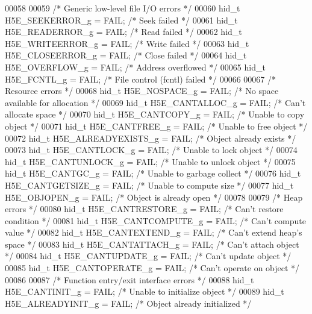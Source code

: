 \begin{DoxyCode}
00058 
00059 \textcolor{comment}{/* Generic low-level file I/O errors */}
00060 hid\_t H5E\_SEEKERROR\_g      = FAIL;      \textcolor{comment}{/* Seek failed */}
00061 hid\_t H5E\_READERROR\_g      = FAIL;      \textcolor{comment}{/* Read failed */}
00062 hid\_t H5E\_WRITEERROR\_g     = FAIL;      \textcolor{comment}{/* Write failed */}
00063 hid\_t H5E\_CLOSEERROR\_g     = FAIL;      \textcolor{comment}{/* Close failed */}
00064 hid\_t H5E\_OVERFLOW\_g       = FAIL;      \textcolor{comment}{/* Address overflowed */}
00065 hid\_t H5E\_FCNTL\_g          = FAIL;      \textcolor{comment}{/* File control (fcntl) failed */}
00066 
00067 \textcolor{comment}{/* Resource errors */}
00068 hid\_t H5E\_NOSPACE\_g        = FAIL;      \textcolor{comment}{/* No space available for allocation */}
00069 hid\_t H5E\_CANTALLOC\_g      = FAIL;      \textcolor{comment}{/* Can't allocate space */}
00070 hid\_t H5E\_CANTCOPY\_g       = FAIL;      \textcolor{comment}{/* Unable to copy object */}
00071 hid\_t H5E\_CANTFREE\_g       = FAIL;      \textcolor{comment}{/* Unable to free object */}
00072 hid\_t H5E\_ALREADYEXISTS\_g  = FAIL;      \textcolor{comment}{/* Object already exists */}
00073 hid\_t H5E\_CANTLOCK\_g       = FAIL;      \textcolor{comment}{/* Unable to lock object */}
00074 hid\_t H5E\_CANTUNLOCK\_g     = FAIL;      \textcolor{comment}{/* Unable to unlock object */}
00075 hid\_t H5E\_CANTGC\_g         = FAIL;      \textcolor{comment}{/* Unable to garbage collect */}
00076 hid\_t H5E\_CANTGETSIZE\_g    = FAIL;      \textcolor{comment}{/* Unable to compute size */}
00077 hid\_t H5E\_OBJOPEN\_g        = FAIL;      \textcolor{comment}{/* Object is already open */}
00078 
00079 \textcolor{comment}{/* Heap errors */}
00080 hid\_t H5E\_CANTRESTORE\_g    = FAIL;      \textcolor{comment}{/* Can't restore condition */}
00081 hid\_t H5E\_CANTCOMPUTE\_g    = FAIL;      \textcolor{comment}{/* Can't compute value */}
00082 hid\_t H5E\_CANTEXTEND\_g     = FAIL;      \textcolor{comment}{/* Can't extend heap's space */}
00083 hid\_t H5E\_CANTATTACH\_g     = FAIL;      \textcolor{comment}{/* Can't attach object */}
00084 hid\_t H5E\_CANTUPDATE\_g     = FAIL;      \textcolor{comment}{/* Can't update object */}
00085 hid\_t H5E\_CANTOPERATE\_g    = FAIL;      \textcolor{comment}{/* Can't operate on object */}
00086 
00087 \textcolor{comment}{/* Function entry/exit interface errors */}
00088 hid\_t H5E\_CANTINIT\_g       = FAIL;      \textcolor{comment}{/* Unable to initialize object */}
00089 hid\_t H5E\_ALREADYINIT\_g    = FAIL;      \textcolor{comment}{/* Object already initialized */}

\end{DoxyCode}
